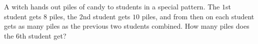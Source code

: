 A witch hands out piles of candy to students in a special pattern. The $1$st student gets $8$ piles, the $2$nd student gets $10$ piles, and from then on each student gets as many piles as the previous two students combined. How many piles does the $6$th student get?

